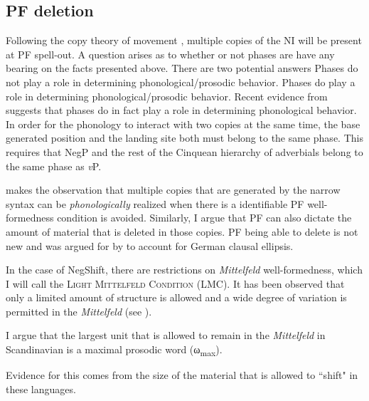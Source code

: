 \documentclass[12pt, letterpaper]{article}
\newcommand{\sub}[1]{\textsubscript{#1}}
\begin{document}
\subsection{PF deletion} \label{sec:PFDeletion}
\ea  Following the copy theory of movement \citet{chomskyMinimalistProgramLinguistic1993}, multiple copies of the NI will be present at PF spell-out. 
\ex A question arises as to whether or not phases are have any bearing on the facts presented above. 
\ex There are two potential answers
	\ea Phases do not play a role in determining phonological/prosodic behavior.  
	\ex Phases do play a role in determining phonological/prosodic behavior.
	\z 
\ex Recent evidence from \citet{weberPhasebasedConstraintsMatch2020} suggests that phases do in fact play a role in determining phonological behavior. 
\ex In order for the phonology to interact with two copies at the same time, the base generated position and the landing site both must belong to the same phase. 
	\ea This requires that NegP and the rest of the Cinquean hierarchy of adverbials \citep{cinqueAdverbsFunctionalHeads1999} belong to the same phase as \emph{v}P.
	\z

\ex \citet{kandybowiczGrammarRepetitionNupe2008} makes the observation that multiple copies that are generated by the narrow syntax can be \emph{phonologically} realized when there is a identifiable PF well-formedness condition is avoided. 
	\ea Similarly, I argue that PF can also dictate the amount of material that is deleted in those copies. 
	\ex PF being able to delete is not new and was argued for by \citet{ottDeletionClausalEllipsis2016} to account for German clausal ellipsis. 
	\z 

\ex In the case of NegShift, there are restrictions on \emph{Mittelfeld} well-formedness, which I will call the \textsc{Light Mittelfeld Condition} (LMC).
	\ea It has been observed that only a limited amount of structure is allowed and a wide degree of variation is permitted in the \emph{Mittelfeld} (see \cite{haiderMittelfeldPhenomenaScrambling2017}). 

	\ex I argue that the largest unit that is allowed to remain in the \emph{Mittelfeld} in Scandinavian is a maximal prosodic word (ω\sub{max}).
	\z 

\ex Evidence for this comes from the size of the material that is allowed to ``shift" in these languages. 
\end{document}
